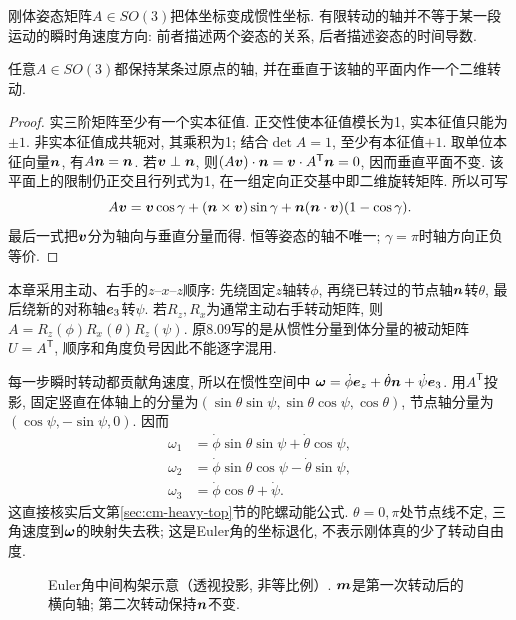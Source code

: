 刚体姿态矩阵$A\in SO(3)$把体坐标变成惯性坐标. 有限转动的轴并不等于某一段运动的瞬时角速度方向: 前者描述两个姿态的关系, 后者描述姿态的时间导数.
\begin{theorem}[Euler轴角定理]
任意$A\in SO(3)$都保持某条过原点的轴, 并在垂直于该轴的平面内作一个二维转动.
\end{theorem}
\begin{proof}
实三阶矩阵至少有一个实本征值. 正交性使本征值模长为1, 实本征值只能为$\pm1$. 非实本征值成共轭对, 其乘积为1; 结合$\det A=1$, 至少有本征值$+1$. 取单位本征向量$\boldsymbol{n}$, 有$A\boldsymbol{n}=\boldsymbol{n}$. 若$\boldsymbol{v}\perp\boldsymbol{n}$, 则$(A\boldsymbol{v})\cdot\boldsymbol{n}=\boldsymbol{v}\cdot A^{\mathsf T}\boldsymbol{n}=0$, 因而垂直平面不变. 该平面上的限制仍正交且行列式为1, 在一组定向正交基中即二维旋转矩阵. 所以可写
\[
A\boldsymbol{v}=\boldsymbol{v}\cos\gamma+(\boldsymbol{n}\times\boldsymbol{v})\sin\gamma
+\boldsymbol{n}(\boldsymbol{n}\cdot\boldsymbol{v})(1-\cos\gamma).
\]
最后一式把$\boldsymbol{v}$分为轴向与垂直分量而得. 恒等姿态的轴不唯一; $\gamma=\pi$时轴方向正负等价.
\end{proof}

本章采用主动、右手的$z$--$x$--$z$顺序: 先绕固定$z$轴转$\phi$, 再绕已转过的节点轴$\boldsymbol{n}$转$\theta$, 最后绕新的对称轴$\boldsymbol{e}_3$转$\psi$. 若$R_z,R_x$为通常主动右手转动矩阵, 则$A=R_z(\phi)R_x(\theta)R_z(\psi)$. 原8.09写的是从惯性分量到体分量的被动矩阵$U=A^{\mathsf T}$, 顺序和角度负号因此不能逐字混用.

每一步瞬时转动都贡献角速度, 所以在惯性空间中
$\boldsymbol{\omega}=\dot\phi\boldsymbol{e}_z+\dot\theta\boldsymbol{n}+\dot\psi\boldsymbol{e}_3$.
用$A^{\mathsf T}$投影, 固定竖直在体轴上的分量为$(\sin\theta\sin\psi,\sin\theta\cos\psi,\cos\theta)$, 节点轴分量为$(\cos\psi,-\sin\psi,0)$. 因而
\begin{align*}
\omega_1&=\dot\phi\sin\theta\sin\psi+\dot\theta\cos\psi,\\
\omega_2&=\dot\phi\sin\theta\cos\psi-\dot\theta\sin\psi,\\
\omega_3&=\dot\phi\cos\theta+\dot\psi.
\end{align*}
这直接核实后文第\ref{sec:cm-heavy-top}节的陀螺动能公式. $\theta=0,\pi$处节点线不定, 三角速度到$\boldsymbol{\omega}$的映射失去秩; 这是Euler角的坐标退化, 不表示刚体真的少了转动自由度.

\begin{figure}[htbp]
\centering
{}
\caption{Euler角中间构架示意（透视投影, 非等比例）. $\boldsymbol{m}$是第一次转动后的横向轴; 第二次转动保持$\boldsymbol{n}$不变.}
\end{figure}

